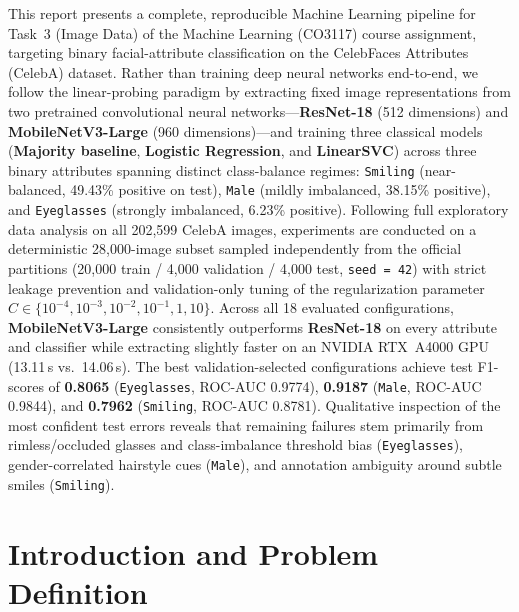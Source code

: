 \documentclass[12pt,a4paper]{article}
\newcommand{\code}[1]{\texttt{#1}}
\begin{document}
This report presents a complete, reproducible Machine Learning pipeline for Task~3 (Image Data) of the Machine Learning (CO3117) course assignment, targeting binary facial-attribute classification on the CelebFaces Attributes (CelebA) dataset. Rather than training deep neural networks end-to-end, we follow the linear-probing paradigm by extracting fixed image representations from two pretrained convolutional neural networks---\textbf{ResNet-18} (512 dimensions) and \textbf{MobileNetV3-Large} (960 dimensions)---and training three classical models (\textbf{Majority baseline}, \textbf{Logistic Regression}, and \textbf{LinearSVC}) across three binary attributes spanning distinct class-balance regimes: \code{Smiling} (near-balanced, 49.43\% positive on test), \code{Male} (mildly imbalanced, 38.15\% positive), and \code{Eyeglasses} (strongly imbalanced, 6.23\% positive). Following full exploratory data analysis on all 202,599 CelebA images, experiments are conducted on a deterministic 28,000-image subset sampled independently from the official partitions (20,000 train / 4,000 validation / 4,000 test, \code{seed = 42}) with strict leakage prevention and validation-only tuning of the regularization parameter $C \in \{10^{-4}, 10^{-3}, 10^{-2}, 10^{-1}, 1, 10\}$. Across all 18 evaluated configurations, \textbf{MobileNetV3-Large} consistently outperforms \textbf{ResNet-18} on every attribute and classifier while extracting slightly faster on an NVIDIA RTX~A4000 GPU (13.11\,s vs.\ 14.06\,s). The best validation-selected configurations achieve test F1-scores of \textbf{0.8065} (\code{Eyeglasses}, ROC-AUC 0.9774), \textbf{0.9187} (\code{Male}, ROC-AUC 0.9844), and \textbf{0.7962} (\code{Smiling}, ROC-AUC 0.8781). Qualitative inspection of the most confident test errors reveals that remaining failures stem primarily from rimless/occluded glasses and class-imbalance threshold bias (\code{Eyeglasses}), gender-correlated hairstyle cues (\code{Male}), and annotation ambiguity around subtle smiles (\code{Smiling}).

\clearpage
\tableofcontents
\clearpage
\listoffigures
\listoftables
\clearpage

\setcounter{page}{1}

\section{Introduction and Problem Definition}
\label{sec:intro}
\end{document}
